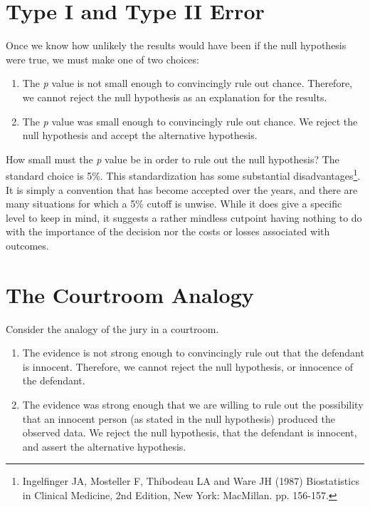 \documentclass[
]{book}
\providecommand{\tightlist}{%
  \setlength{\itemsep}{0pt}\setlength{\parskip}{0pt}}
\begin{document}
\hypertarget{type-i-and-type-ii-error}{%
\section{Type I and Type II Error}\label{type-i-and-type-ii-error}}

Once we know how unlikely the results would have been if the null hypothesis were true, we must make one of two choices:

\begin{enumerate}
\def\labelenumi{\arabic{enumi}.}
\tightlist
\item
  The \emph{p} value is not small enough to convincingly rule out chance. Therefore, we cannot reject the null hypothesis as an explanation for the results.
\item
  The \emph{p} value was small enough to convincingly rule out chance. We reject the null hypothesis and accept the alternative hypothesis.
\end{enumerate}

How small must the \emph{p} value be in order to rule out the null hypothesis? The standard choice is 5\%. This standardization has some substantial disadvantages\footnote{Ingelfinger JA, Mosteller F, Thibodeau LA and Ware JH (1987) Biostatistics in Clinical Medicine, 2nd Edition, New York: MacMillan. pp. 156-157.}. It is simply a convention that has become accepted over the years, and there are many situations for which a 5\% cutoff is unwise. While it does give a specific level to keep in mind, it suggests a rather mindless cutpoint having nothing to do with the importance of the decision nor the costs or losses associated with outcomes.

\hypertarget{the-courtroom-analogy}{%
\section{The Courtroom Analogy}\label{the-courtroom-analogy}}

Consider the analogy of the jury in a courtroom.

\begin{enumerate}
\def\labelenumi{\arabic{enumi}.}
\tightlist
\item
  The evidence is not strong enough to convincingly rule out that the defendant is innocent. Therefore, we cannot reject the null hypothesis, or innocence of the defendant.
\item
  The evidence was strong enough that we are willing to rule out the possibility that an innocent person (as stated in the null hypothesis) produced the observed data. We reject the null hypothesis, that the defendant is innocent, and assert the alternative hypothesis.
\end{enumerate}
\end{document}
